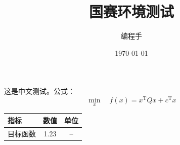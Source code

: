 \documentclass[UTF8]{ctexart}
\title{国赛环境测试}
\author{编程手}
\date{\today}
\begin{document}
\maketitle
这是中文测试。公式：
\[
\min_{x} \quad f(x)=x^{\mathrm{T}}Qx+c^{\mathrm{T}}x
\]
\begin{table}[h]
\centering
\begin{tabular}{lcc}
\toprule
指标 & 数值 & 单位 \\
\midrule
目标函数 & 1.23 & -- \\
\bottomrule
\end{tabular}
\end{table}
\end{document}
